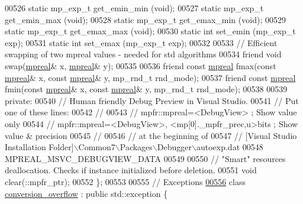 \begin{DoxyCode}
00526     \textcolor{keyword}{static} mp\_exp\_t  get\_emin\_min (\textcolor{keywordtype}{void});
00527     \textcolor{keyword}{static} mp\_exp\_t  get\_emin\_max (\textcolor{keywordtype}{void});
00528     \textcolor{keyword}{static} mp\_exp\_t  get\_emax\_min (\textcolor{keywordtype}{void});
00529     \textcolor{keyword}{static} mp\_exp\_t  get\_emax\_max (\textcolor{keywordtype}{void});
00530     \textcolor{keyword}{static} \textcolor{keywordtype}{int}       set\_emin (mp\_exp\_t exp);
00531     \textcolor{keyword}{static} \textcolor{keywordtype}{int}       set\_emax (mp\_exp\_t exp);
00532 
00533     \textcolor{comment}{// Efficient swapping of two mpreal values - needed for std algorithms}
00534     \textcolor{keyword}{friend} \textcolor{keywordtype}{void} swap(\hyperlink{classmpfr_1_1mpreal}{mpreal}& x, \hyperlink{classmpfr_1_1mpreal}{mpreal}& y);
00535 
00536     \textcolor{keyword}{friend} \textcolor{keyword}{const} \hyperlink{classmpfr_1_1mpreal}{mpreal} fmax(\textcolor{keyword}{const} \hyperlink{classmpfr_1_1mpreal}{mpreal}& x, \textcolor{keyword}{const} \hyperlink{classmpfr_1_1mpreal}{mpreal}& y, mp\_rnd\_t rnd\_mode);
00537     \textcolor{keyword}{friend} \textcolor{keyword}{const} \hyperlink{classmpfr_1_1mpreal}{mpreal} fmin(\textcolor{keyword}{const} \hyperlink{classmpfr_1_1mpreal}{mpreal}& x, \textcolor{keyword}{const} \hyperlink{classmpfr_1_1mpreal}{mpreal}& y, mp\_rnd\_t rnd\_mode);
00538 
00539 \textcolor{keyword}{private}:
00540     \textcolor{comment}{// Human friendly Debug Preview in Visual Studio.}
00541     \textcolor{comment}{// Put one of these lines:}
00542     \textcolor{comment}{//}
00543     \textcolor{comment}{// mpfr::mpreal=<DebugView>                              ; Show value only}
00544     \textcolor{comment}{// mpfr::mpreal=<DebugView>, <mp[0].\_mpfr\_prec,u>bits    ; Show value & precision}
00545     \textcolor{comment}{//}
00546     \textcolor{comment}{// at the beginning of}
00547     \textcolor{comment}{// [Visual Studio Installation Folder]\(\backslash\)Common7\(\backslash\)Packages\(\backslash\)Debugger\(\backslash\)autoexp.dat}
00548     MPREAL\_MSVC\_DEBUGVIEW\_DATA
00549 
00550     \textcolor{comment}{// "Smart" resources deallocation. Checks if instance initialized before deletion.}
00551     \textcolor{keywordtype}{void} clear(::mpfr\_ptr);
00552 \};
00553 
00555 \textcolor{comment}{// Exceptions}
\hyperlink{classmpfr_1_1conversion__overflow}{00556} \textcolor{keyword}{class }\hyperlink{classmpfr_1_1conversion__overflow}{conversion\_overflow} : \textcolor{keyword}{public} std::exception \{

\end{DoxyCode}
